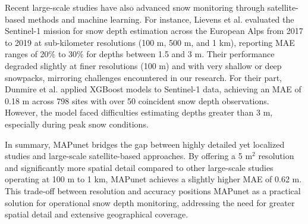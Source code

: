 \documentclass[preprint,12pt]{elsarticle}
\begin{document}
Recent large-scale studies have also advanced snow monitoring through satellite-based methods and machine learning. For instance, Lievens et al. \cite{lievens2022sentinel} evaluated the Sentinel-1 mission for snow depth estimation across the European Alps from 2017 to 2019 at sub-kilometer resolutions (100 m, 500 m, and 1 km), reporting MAE ranges of 20\% to 30\% for depths between 1.5 and 3 m. Their performance degraded slightly at finer resolutions (100 m) and with very shallow or deep snowpacks, mirroring challenges encountered in our research. For their part, Dunmire et al. \cite{dunmire2024machine} applied XGBoost models to Sentinel-1 data, achieving an MAE of 0.18 m across 798 sites with over 50 coincident snow depth observations. However, the model faced difficulties estimating depths greater than 3 m, especially during peak snow conditions.


In summary, MAPunet bridges the gap between highly detailed yet localized studies and large-scale satellite-based approaches. By offering a 5 m$^2$ resolution and significantly more spatial detail compared to other large-scale studies operating at 100 m to 1 km, MAPunet achieves a slightly higher MAE of 0.62 m. This trade-off between resolution and accuracy positions MAPunet as a practical solution for operational snow depth monitoring, addressing the need for greater spatial detail and extensive geographical coverage.
\end{document}
